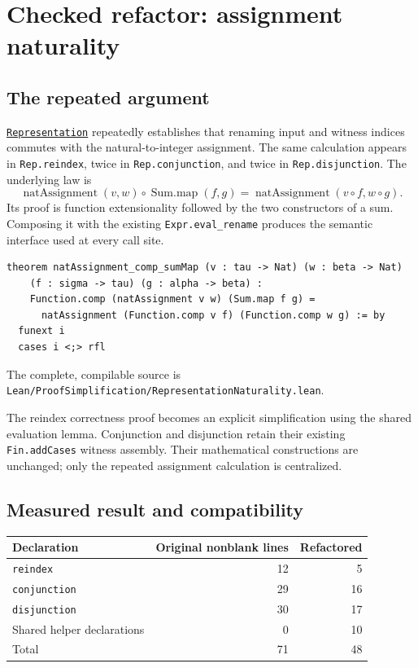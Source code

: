 \documentclass[11pt,letterpaper]{article}
\newcommand{\code}[1]{\nolinkurl{#1}}
\newcommand{\src}[1]{\href{https://github.com/VladimirReshetnikov/ProveIt/blob/60e9c5d620c6c387d932876cfa2d9376f64ea56c/Computability/DiophantineConsistency/Lean/DiophantineConsistency/#1.lean}{\texttt{#1}}}
\begin{document}
\section{Checked refactor: assignment naturality}

\subsection{The repeated argument}

\src{Representation} repeatedly establishes that renaming input and witness
indices commutes with the natural-to-integer assignment. The same calculation
appears in \code{Rep.reindex}, twice in \code{Rep.conjunction}, and twice in
\code{Rep.disjunction}. The underlying law is
\[
  \operatorname{natAssignment}(v,w)\circ\operatorname{Sum.map}(f,g)
  =\operatorname{natAssignment}(v\circ f,w\circ g).
\]
Its proof is function extensionality followed by the two constructors of a sum.
Composing it with the existing \code{Expr.eval_rename} produces the semantic
interface used at every call site.

\begin{lstlisting}
theorem natAssignment_comp_sumMap (v : tau -> Nat) (w : beta -> Nat)
    (f : sigma -> tau) (g : alpha -> beta) :
    Function.comp (natAssignment v w) (Sum.map f g) =
      natAssignment (Function.comp v f) (Function.comp w g) := by
  funext i
  cases i <;> rfl
\end{lstlisting}
The complete, compilable source is \code{Lean/ProofSimplification/RepresentationNaturality.lean}.

The reindex correctness proof becomes an explicit simplification using the
shared evaluation lemma. Conjunction and disjunction retain their existing
\code{Fin.addCases} witness assembly. Their mathematical constructions are
unchanged; only the repeated assignment calculation is centralized.

\subsection{Measured result and compatibility}

\begin{center}
\begin{tabular}{lrr}
\toprule
Declaration & Original nonblank lines & Refactored\\
\midrule
\code{reindex} & 12 & 5\\
\code{conjunction} & 29 & 16\\
\code{disjunction} & 30 & 17\\
Shared helper declarations & 0 & 10\\
\midrule
Total & 71 & 48\\
\bottomrule
\end{tabular}
\end{center}
\end{document}
